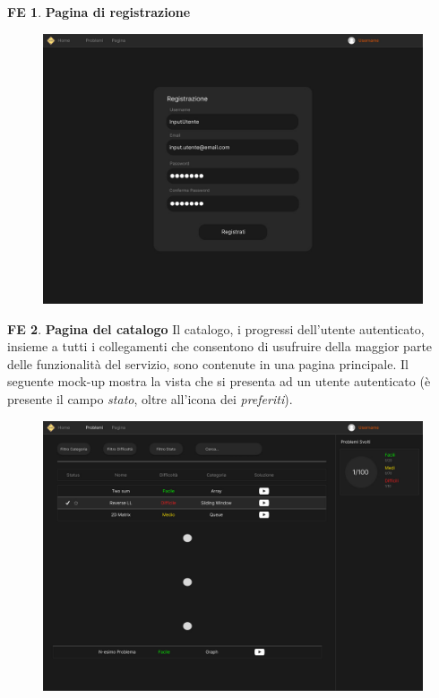 \documentclass[11pt, a4paper]{article}
\theoremstyle{definition}
\newtheorem{frontend}{FE}
\begin{document}
\begin{frontend}
\label{areaexercise}
\textbf{Pagina di registrazione }
\end{frontend}
\begin{figure}[H]
\centering
\includegraphics[scale=0.22]{materiale/immaginife/registrazione.jpeg}
\end{figure}

\newpage
\begin{frontend}
\textbf{Pagina del catalogo }
Il catalogo, i progressi dell'utente autenticato, insieme a tutti i
collegamenti che consentono di usufruire della maggior parte delle
funzionalità del servizio, sono contenute in una pagina principale.
Il seguente mock-up mostra la vista che si presenta ad un utente
autenticato (è presente il campo \textit{stato}, oltre all'icona
dei \textit{preferiti}).
\end{frontend}
\begin{figure}[H]
\centering
\includegraphics[scale=0.195]{materiale/immaginife/homecatalogo.jpeg}
\end{figure}
\end{document}
